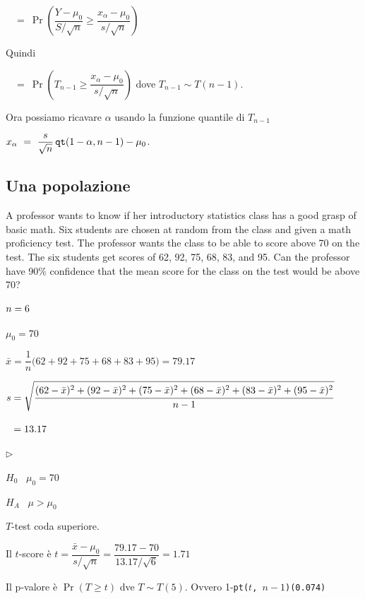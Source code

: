\documentclass[11pt,openany]{book}
\newcommand{\mylabel}[1]{{\footnotesize\textsf{#1}}\hfill}
\renewenvironment{itemize}
  {\begin{list}{$\triangleright$}{%
   \setlength{\parskip}{0mm}
   \setlength{\topsep}{.2\baselineskip}
   \setlength{\rightmargin}{0mm}
   \setlength{\listparindent}{0mm}
   \setlength{\itemindent}{0mm}
   \setlength{\labelwidth}{3ex}
   \setlength{\itemsep}{.4\baselineskip}
   \setlength{\parsep}{0mm}
   \setlength{\partopsep}{0mm}
   \setlength{\labelsep}{1ex}
   \setlength{\leftmargin}{\labelwidth+\labelsep}
   \let\makelabel\mylabel}}{%
   \end{list}\vspace*{-1.3mm}}
\begin{document}
$\phantom{\alpha}\ =\ \Pr\left(\dfrac{Y-\mu_0}{S/\sqrt{n}}\ge \dfrac{x_\alpha-\mu_0}{s/\sqrt{n}}\right)$\medskip

Quindi\medskip

$\phantom{\alpha}\ =\ \Pr\left(T_{n-1}\ge \dfrac{x_\alpha-\mu_0}{s/\sqrt{n}}\right)$ dove $T_{n-1}\sim T(n-1)$.

Ora possiamo ricavare $\alpha$ usando la funzione quantile di $T_{n-1}$\medskip

\hfill $x_\alpha\ =\ \dfrac{s}{\sqrt n}\,{\tt qt}(1-\alpha,n-1)-\mu_0$.



\subsection{Una popolazione}
A professor wants to know if her introductory statistics class has a good grasp of basic math. Six students are chosen at random from the class and given a math proficiency test. The professor wants the class to be able to score above 70 on the test. The six students get scores of 62, 92, 75, 68, 83, and 95. Can the professor have 90\%  confidence that the mean score for the class on the test would be above 70?

$\strut n=6$

$\mu_0=70$

$\bar x =\dfrac1n\big(62+92+75+68+83+95\big) =79.17$

$s = \sqrt{\dfrac{\strut(62-\bar x)^2+(92-\bar x)^2+(75-\bar x)^2+(68-\bar x)^2+(83-\bar x)^2+(95-\bar x)^2}{n-1}}$

$\strut\phantom{s} = 13.17$

\begin{itemize}
\item[1.] $H_0$ \ $\mu_0 = 70$

\item[2.] $H_A$ \ $\mu>\mu_0$

\item[3.] $T$-test coda superiore. 

\item[4.] Il $t$-score è 
$t = \dfrac{\bar x - \mu_0}{s/\sqrt{n}}=\dfrac{79.17-70}{13.17/\sqrt{6}} = 1.71$

\item[5.] Il p-valore è $\Pr(T\ge t)$ dve $T\sim T(5)$. Ovvero 1-{\tt pt($t$, $n-1$)}\hfill{\tt (0.074)}
\end{itemize}

\end{document}
